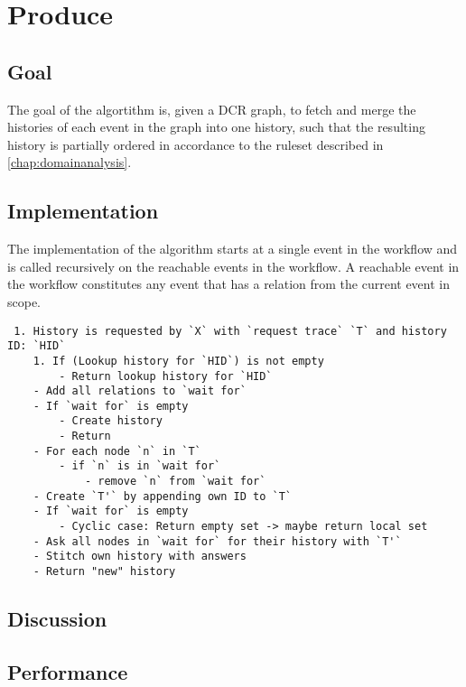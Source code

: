 \section{Produce}
\subsection{Goal} %
The goal of the algortithm is, given a DCR graph, to fetch and merge the histories of each event in the graph into one history, such that the resulting history is partially ordered in accordance to the ruleset described in \ref{chap:domainanalysis}. 


\subsection{Implementation} %
The implementation of the algorithm starts at a single event in the workflow and is called recursively on the reachable events in the workflow. A reachable event in the workflow constitutes any event that has a relation from the current event in scope. 


\begin{lstlisting}
 1. History is requested by `X` with `request trace` `T` and history ID: `HID`
    1. If (Lookup history for `HID`) is not empty
        - Return lookup history for `HID`
    - Add all relations to `wait for`
    - If `wait for` is empty
        - Create history
        - Return
    - For each node `n` in `T`
        - if `n` is in `wait for`
            - remove `n` from `wait for`
    - Create `T'` by appending own ID to `T`
    - If `wait for` is empty
        - Cyclic case: Return empty set -> maybe return local set
    - Ask all nodes in `wait for` for their history with `T'`
    - Stitch own history with answers
    - Return "new" history
\end{lstlisting}

\subsection{Discussion} %
\subsection{Performance} %